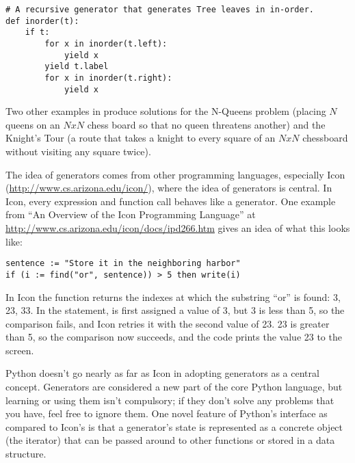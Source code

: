 \documentclass{howto}
\begin{document}
\begin{verbatim}
# A recursive generator that generates Tree leaves in in-order.
def inorder(t):
    if t:
        for x in inorder(t.left):
            yield x
        yield t.label
        for x in inorder(t.right):
            yield x
\end{verbatim}

Two other examples in  produce
solutions for the N-Queens problem (placing $N$ queens on an $NxN$
chess board so that no queen threatens another) and the Knight's Tour
(a route that takes a knight to every square of an $NxN$ chessboard
without visiting any square twice). 

The idea of generators comes from other programming languages,
especially Icon (\url{http://www.cs.arizona.edu/icon/}), where the
idea of generators is central.  In Icon, every
expression and function call behaves like a generator.  One example
from ``An Overview of the Icon Programming Language'' at
\url{http://www.cs.arizona.edu/icon/docs/ipd266.htm} gives an idea of
what this looks like:

\begin{verbatim}
sentence := "Store it in the neighboring harbor"
if (i := find("or", sentence)) > 5 then write(i)
\end{verbatim}

In Icon the  function returns the indexes at which the
substring ``or'' is found: 3, 23, 33.  In the  statement,
 is first assigned a value of 3, but 3 is less than 5, so the
comparison fails, and Icon retries it with the second value of 23.  23
is greater than 5, so the comparison now succeeds, and the code prints
the value 23 to the screen.

Python doesn't go nearly as far as Icon in adopting generators as a
central concept.  Generators are considered a new part of the core
Python language, but learning or using them isn't compulsory; if they
don't solve any problems that you have, feel free to ignore them.
One novel feature of Python's interface as compared to
Icon's is that a generator's state is represented as a concrete object
(the iterator) that can be passed around to other functions or stored
in a data structure.

\begin{seealso}


\end{seealso}
\end{document}
